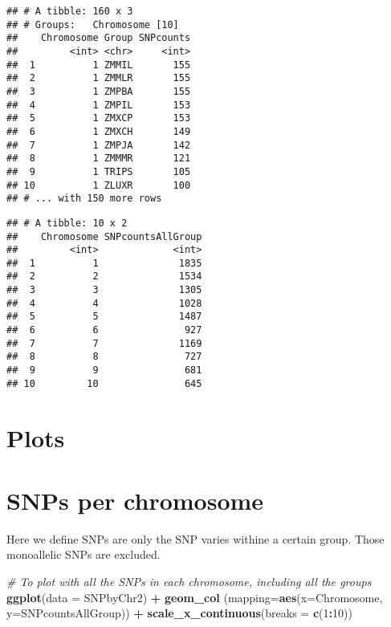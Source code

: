 \documentclass[]{article}
\newenvironment{Shaded}{\begin{snugshade}}{\end{snugshade}}
\newcommand{\KeywordTok}[1]{\textcolor[rgb]{0.13,0.29,0.53}{\textbf{#1}}}
\newcommand{\DataTypeTok}[1]{\textcolor[rgb]{0.13,0.29,0.53}{#1}}
\newcommand{\DecValTok}[1]{\textcolor[rgb]{0.00,0.00,0.81}{#1}}
\newcommand{\StringTok}[1]{\textcolor[rgb]{0.31,0.60,0.02}{#1}}
\newcommand{\CommentTok}[1]{\textcolor[rgb]{0.56,0.35,0.01}{\textit{#1}}}
\newcommand{\OperatorTok}[1]{\textcolor[rgb]{0.81,0.36,0.00}{\textbf{#1}}}
\newcommand{\NormalTok}[1]{#1}
\begin{document}
\begin{verbatim}
## # A tibble: 160 x 3
## # Groups:   Chromosome [10]
##    Chromosome Group SNPcounts
##         <int> <chr>     <int>
##  1          1 ZMMIL       155
##  2          1 ZMMLR       155
##  3          1 ZMPBA       155
##  4          1 ZMPIL       153
##  5          1 ZMXCP       153
##  6          1 ZMXCH       149
##  7          1 ZMPJA       142
##  8          1 ZMMMR       121
##  9          1 TRIPS       105
## 10          1 ZLUXR       100
## # ... with 150 more rows
\end{verbatim}

\begin{Shaded}
\end{Shaded}

\begin{verbatim}
## # A tibble: 10 x 2
##    Chromosome SNPcountsAllGroup
##         <int>             <int>
##  1          1              1835
##  2          2              1534
##  3          3              1305
##  4          4              1028
##  5          5              1487
##  6          6               927
##  7          7              1169
##  8          8               727
##  9          9               681
## 10         10               645
\end{verbatim}

\section{Plots}\label{plots}

\section{SNPs per chromosome}\label{snps-per-chromosome}

Here we define SNPs are only the SNP varies withine a certain group.
Those monoallelic SNPs are excluded.

\begin{Shaded}
\begin{Highlighting}[]
\CommentTok{# To plot with all the SNPs in each chromosome, including all the groups}
\KeywordTok{ggplot}\NormalTok{(}\DataTypeTok{data =}\NormalTok{ SNPbyChr2) }\OperatorTok{+}\StringTok{ }\KeywordTok{geom_col}\NormalTok{ (}\DataTypeTok{mapping=}\KeywordTok{aes}\NormalTok{(}\DataTypeTok{x=}\NormalTok{Chromosome, }\DataTypeTok{y=}\NormalTok{SNPcountsAllGroup)) }\OperatorTok{+}\StringTok{ }\KeywordTok{scale_x_continuous}\NormalTok{(}\DataTypeTok{breaks =} \KeywordTok{c}\NormalTok{(}\DecValTok{1}\OperatorTok{:}\DecValTok{10}\NormalTok{))}
\end{Highlighting}
\end{Shaded}
\end{document}
